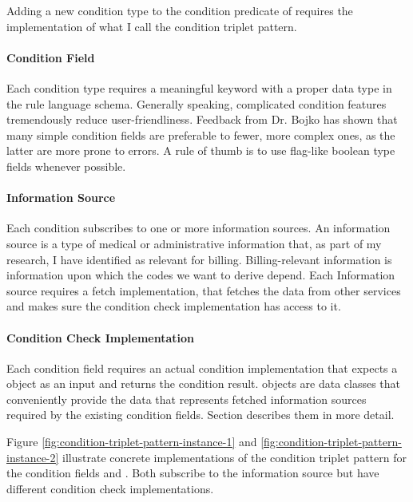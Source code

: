 Adding a new condition type to the condition predicate of \RL requires the implementation of what I call the condition triplet pattern.

\paragraph{Condition Field}
Each condition type requires a meaningful keyword with a proper data type in the rule language schema.
Generally speaking, complicated condition features tremendously reduce user-friendliness.
Feedback from Dr. Bojko has shown that many simple condition fields are preferable to fewer, more complex ones, as the latter are more prone to errors.
A rule of thumb is to use flag-like boolean type fields whenever possible.

\paragraph{Information Source}
Each condition subscribes to one or more information sources.
An information source is a type of medical or administrative information that, as part of my research, I have identified as relevant for billing.
Billing-relevant information is information upon which the codes we want to derive depend.
Each Information source requires a fetch implementation, that fetches the data from other \AV services and makes sure the condition check implementation has access to it.

\paragraph{Condition Check Implementation}
Each condition field requires an actual condition implementation that expects a  object as an input and returns the condition result.
 objects are data classes that conveniently provide the data that represents fetched information sources required by the existing condition fields.
Section \addref describes them in more detail.

Figure \ref{fig:condition-triplet-pattern-instance-1} and \ref{fig:condition-triplet-pattern-instance-2} illustrate concrete implementations of the condition triplet pattern
for the condition fields  and .
Both subscribe to the  information source but have different condition check implementations.

